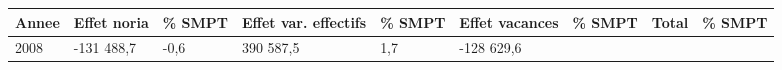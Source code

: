 \begin{longtable}[]{@{}lllllllll@{}}
\toprule
\begin{minipage}[b]{0.05\columnwidth}\raggedright
Annee\strut
\end{minipage} & \begin{minipage}[b]{0.10\columnwidth}\raggedright
Effet noria\strut
\end{minipage} & \begin{minipage}[b]{0.06\columnwidth}\raggedright
\% SMPT\strut
\end{minipage} & \begin{minipage}[b]{0.17\columnwidth}\raggedright
Effet var. effectifs\strut
\end{minipage} & \begin{minipage}[b]{0.06\columnwidth}\raggedright
\% SMPT\strut
\end{minipage} & \begin{minipage}[b]{0.12\columnwidth}\raggedright
Effet vacances\strut
\end{minipage} & \begin{minipage}[b]{0.06\columnwidth}\raggedright
\% SMPT\strut
\end{minipage} & \begin{minipage}[b]{0.08\columnwidth}\raggedright
Total\strut
\end{minipage} & \begin{minipage}[b]{0.06\columnwidth}\raggedright
\% SMPT\strut
\end{minipage}\tabularnewline
\midrule
\endhead
\begin{minipage}[t]{0.05\columnwidth}\raggedright
2008\strut
\end{minipage} & \begin{minipage}[t]{0.10\columnwidth}\raggedright
-131 488,7\strut
\end{minipage} & \begin{minipage}[t]{0.06\columnwidth}\raggedright
-0,6\strut
\end{minipage} & \begin{minipage}[t]{0.17\columnwidth}\raggedright
390 587,5\strut
\end{minipage} & \begin{minipage}[t]{0.06\columnwidth}\raggedright
1,7\strut
\end{minipage} & \begin{minipage}[t]{0.12\columnwidth}\raggedright
-128 629,6\strut
\end{minipage} & \begin{minipage}[t]{0.06\columnwidth}\raggedright

\end{minipage}
\end{longtable}
